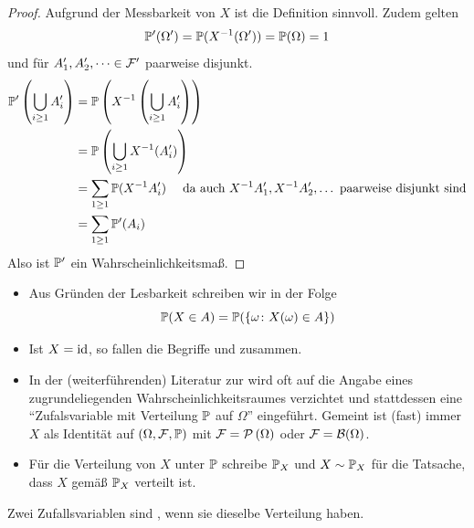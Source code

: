 \begin{proof}
    Aufgrund der Messbarkeit von $X$ ist die Definition sinnvoll. Zudem gelten
    \begin{equation*}
        \P'(\Omega') = \P(X^{-1}(\Omega')) = \P(\Omega) = 1
    \end{equation*}
    und für $A_1', A_2', \dots \in \F'$ paarweise disjunkt.
    \begin{equation*}
    \begin{aligned}
        \P' \left( \bigcup_{i \geq 1} A_i' \right)
        &= \P \left(X^{-1}\left( \bigcup_{i \geq 1} A_i' \right) \right) \\
        &= \P \left( \bigcup_{i \geq 1} X^{-1}(A_i') \right) \\
        &= \sum_{1 \geq 1} \P(X^{-1} A_i') \quad \text{ da auch } X^{-1}A_1', X^{-1}A_2', \dots \text{ paarweise disjunkt sind} \\
        &= \sum_{1 \geq 1} \P'(A_i)
    \end{aligned}
    \end{equation*}
    Also ist $\P'$ ein Wahrscheinlichkeitsmaß.
\end{proof}

\begin{*bemerkung}
    \begin{itemize}[leftmargin=*, nolistsep]
        \item Aus Gründen der Lesbarkeit schreiben wir in der Folge
        \begin{equation*}
        	\P (X \in A) = \P ( \menge{\omega \colon X(\omega) \in A} )
        \end{equation*}
        \item Ist $X = \id$, so fallen die Begriffe \WMass und \WVerteilung zusammen.
        \item In der (weiterführenden) Literatur zur \WTheorie wird oft auf die Angabe eines zugrundeliegenden Wahrscheinlichkeitsraumes verzichtet und stattdessen eine ``Zufalsvariable mit Verteilung $\P$ auf $\Omega$'' eingeführt.
        Gemeint ist (fast) immer $X$ als Identität auf $(\Omega, \F, \P)$ mit $\F = \pows\Omega$ oder $\F = \borel\Omega$.
        \item Für die Verteilung von $X$ unter $\P$ schreibe $\P_X$ und $X \sim \P_{X}$ für die Tatsache, dass $X$ gemäß $\P_X$ verteilt ist.
    \end{itemize}
\end{*bemerkung}

\begin{definition}
    Zwei Zufallsvariablen sind , wenn sie dieselbe Verteilung haben.
\end{definition}

